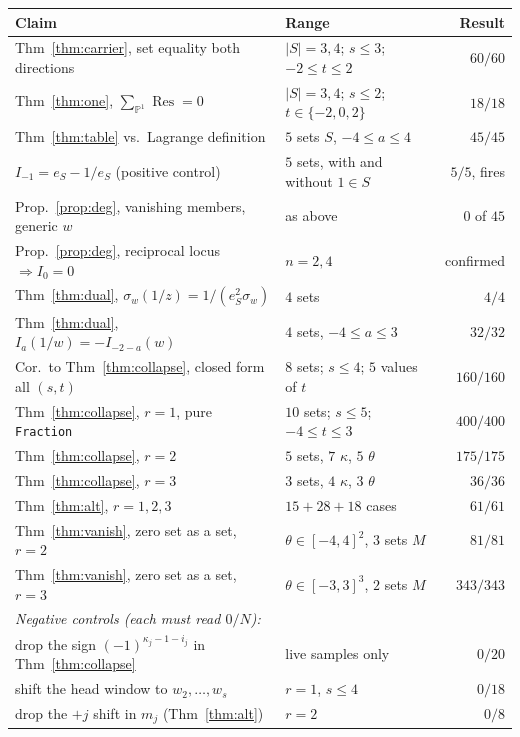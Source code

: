 \documentclass[11pt]{article}
\theoremstyle{definition}
\theoremstyle{remark}
\DeclareMathOperator{\Res}{Res}
\begin{document}
\begin{center}
\begin{tabular}{llr}
\hline
Claim & Range & Result\\
\hline
Thm~\ref{thm:carrier}, set equality both directions & $|S|=3,4$; $s\le3$; $-2\le t\le2$ & $60/60$\\
Thm~\ref{thm:one}, $\sum_{\mathbb{P}^1}\Res=0$ & $|S|=3,4$; $s\le2$; $t\in\{-2,0,2\}$ & $18/18$\\
Thm~\ref{thm:table} vs.\ Lagrange definition & $5$ sets $S$, $-4\le a\le4$ & $45/45$\\
$I_{-1}=e_S-1/e_S$ (positive control) & $5$ sets, with and without $1\in S$ & $5/5$, fires\\
Prop.~\ref{prop:deg}, vanishing members, generic $w$ & as above & $0$ of $45$\\
Prop.~\ref{prop:deg}, reciprocal locus $\Rightarrow I_0=0$ & $n=2,4$ & confirmed\\
Thm~\ref{thm:dual}, $\sigma_w(1/z)=1/(e_S^2\sigma_w)$ & $4$ sets & $4/4$\\
Thm~\ref{thm:dual}, $I_a(1/w)=-I_{-2-a}(w)$ & $4$ sets, $-4\le a\le3$ & $32/32$\\
Cor.\ to Thm~\ref{thm:collapse}, closed form all $(s,t)$ & $8$ sets; $s\le4$; $5$ values of $t$ & $160/160$\\
Thm~\ref{thm:collapse}, $r=1$, pure \texttt{Fraction} & $10$ sets; $s\le5$; $-4\le t\le3$ & $400/400$\\
Thm~\ref{thm:collapse}, $r=2$ & $5$ sets, $7$ $\kappa$, $5$ $\theta$ & $175/175$\\
Thm~\ref{thm:collapse}, $r=3$ & $3$ sets, $4$ $\kappa$, $3$ $\theta$ & $36/36$\\
Thm~\ref{thm:alt}, $r=1,2,3$ & $15+28+18$ cases & $61/61$\\
Thm~\ref{thm:vanish}, zero set as a set, $r=2$ & $\theta\in[-4,4]^2$, $3$ sets $M$ & $81/81$\\
Thm~\ref{thm:vanish}, zero set as a set, $r=3$ & $\theta\in[-3,3]^3$, $2$ sets $M$ & $343/343$\\
\hline
\multicolumn{3}{l}{\emph{Negative controls (each must read $0/N$):}}\\
drop the sign $(-1)^{\kappa_j-1-i_j}$ in Thm~\ref{thm:collapse} & live samples only & $0/20$\\
shift the head window to $w_2,\dots,w_s$ & $r=1$, $s\le4$ & $0/18$\\
drop the $+j$ shift in $m_j$ (Thm~\ref{thm:alt}) & $r=2$ & $0/8$\\
\hline
\end{tabular}
\end{center}
\end{document}
